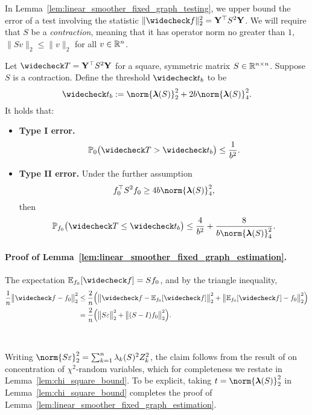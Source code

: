 In Lemma~\ref{lem:linear_smoother_fixed_graph_testing}, we upper bound the error of a test involving the statistic $\|\wc{f}\|_2^2 = {\bf Y}^{\top} S^2 {\bf Y}$. We will require that $S$ be a \emph{contraction}, meaning that it has operator norm no greater than $1$, $\|Sv\|_2 \leq \|v\|_2$ for all $v \in \mathbb{R}^n$.
\begin{lemma}
	\label{lem:linear_smoother_fixed_graph_testing}
	Let $\wc{T} = {\bf Y}^{\top} S^2 {\bf Y}$ for a square, symmetric matrix $S \in \mathbb{R}^{n \times n}$. Suppose $S$ is a contraction. Define the threshold $\wc{t}_b$ to be 
	\begin{equation}
	\label{eqn:linear_smoother_fixed_graph_threshold}
	\wc{t}_{b} := \norm{\lambdavec(S)}_2^2 + 2b \norm{\lambdavec(S)}_4^2.
	\end{equation}
	It holds that:
	\begin{itemize}
		\item \textbf{Type I error.}
		\begin{equation}
		\label{eqn:linear_smoother_fixed_graph_testing_typeI}
		\Pbb_0\bigl(\wc{T} > \wc{t}_b\bigr) \leq \frac{1}{b^2}.
		\end{equation}
		\item \textbf{Type II error.} Under the further assumption
		\begin{equation}
		\label{eqn:linear_smoother_fixed_graph_testing_critical_radius}
		f_0^{\top} S^2 f_0 \geq 4b \norm{\lambdavec(S)}_4^2,
		\end{equation}
		then
		\begin{equation}
		\label{eqn:linear_smoother_fixed_graph_testing_typeII}
		\Pbb_{f_0}\bigl(\wc{T} \leq \wc{t}_b\bigr) \leq \frac{4}{b^2} + \frac{8}{b \norm{\lambdavec(S)}_4^{2}}.
		\end{equation}
	\end{itemize}
\end{lemma}

\paragraph{Proof of Lemma~\ref{lem:linear_smoother_fixed_graph_estimation}.}
The expectation $\Ebb_{f_0}[\wc{f}] = Sf_0$, and by the triangle inequality,
\begin{align*}
\frac{1}{n}\bigl\|\wc{f} - f_0\bigr\|_2^2 & \leq \frac{2}{n}\Bigl(\bigl\|\wc{f} - \Ebb_{f_0}[\wc{f}]\bigr\|_2^2 + \bigl\|\Ebb_{f_0}[\wc{f}] - f_0\bigr\|_2^2\Bigr) \\ 
& = \frac{2}{n}\Bigl(\bigl\|S\varepsilon\bigr\|_2^2 + \bigl\|(S - I)f_0\bigr\|_2^2\Bigr).
\end{align*}
 \\
 \\
Writing $\norm{S\varepsilon}_2^2 = \sum_{k = 1}^{n} \lambda_k(S)^2 Z_k^2$, the claim follows from the result of \citet{laurent00} on concentration of $\chi^2$-random variables, which for completeness we restate in Lemma~\ref{lem:chi_square_bound}. To be explicit, taking $t = \norm{\lambdavec(S)}_2^2$ in Lemma~\ref{lem:chi_square_bound} completes the proof of Lemma~\ref{lem:linear_smoother_fixed_graph_estimation}. 

